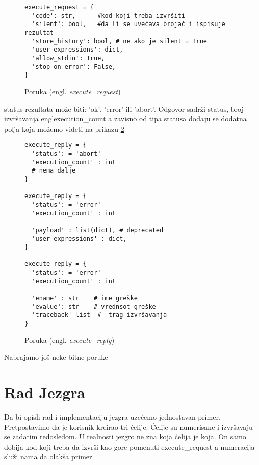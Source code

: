 \documentclass[a4paper]{article}
\newcommand{\eng}[1]{(engl. \textit{#1})}
\begin{document}
{\begin{figure}[h!]
\begin{center}
  \begin{verbatim}
execute_request = {
  'code': str,      #kod koji treba izvršiti
  'silent': bool,   #da li se uvećava brojač i ispisuje rezultat
  'store_history': bool, # ne ako je silent = True
  'user_expressions': dict,
  'allow_stdin': True,
  'stop_on_error': False,
}      
\end{verbatim}
\end{center} 
\caption{Poruka \eng{execute\_request}}
\label{fig:execute}
\end{figure}

status rezultata može biti: 'ok', 'error' ili 'abort'. 
Odgovor sadrži status, broj izvršavanja engl{execution\_count} a zavisno od tipa
statusa dodaju se dodatna polja koja možemo videti na prikazu \ref{fig:execute_reply}


\begin{figure}[h!]
\begin{center}

\begin{verbatim}
execute_reply = {
  'status': = 'abort'
  'execution_count' : int
  # nema dalje
}      

execute_reply = {
  'status': = 'error'
  'execution_count' : int

  'payload' : list(dict), # deprecated
  'user_expressions' : dict,
}      

execute_reply = {
  'status': = 'error'
  'execution_count' : int

  'ename' : str    # ime greške
  'evalue': str    # vrednsot greške
  'traceback' list  #  trag izvršavanja
}      
\end{verbatim}
\end{center} 
\caption{Poruka \eng{execute\_reply}}
\label{fig:execute_reply}
\end{figure}


Nabrajamo još neke bitne poruke







\section{Rad Jezgra}
\label{sec:Jezgro}

Da bi opisli rad i implementaciju jezgra uzećemo jednostavan primer.
Pretpostavimo da je korisnik kreirao tri ćelije.
Ćelije su numerisane i izvršavaju se zadatim redosledom.
U realnosti jezgro ne zna koja ćelija je koja. 
On samo dobija  kod koji treba da izvrši kao gore pomenuti execute\_request a
numeracija služi nama da olakša primer.

}
\end{document}
